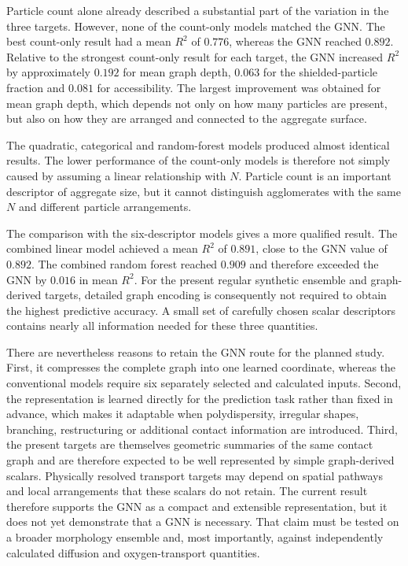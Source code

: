 \documentclass[12pt,a4paper]{article}
\begin{document}
Particle count alone already described a substantial part of the variation in
the three targets. However, none of the count-only models matched the GNN. The
best count-only result had a mean $R^2$ of $0.776$, whereas the GNN reached
$0.892$. Relative to the strongest count-only result for each target, the GNN
increased $R^2$ by approximately $0.192$ for mean graph depth, $0.063$ for the
shielded-particle fraction and $0.081$ for accessibility. The largest
improvement was obtained for mean graph depth, which depends not only on how
many particles are present, but also on how they are arranged and connected to
the aggregate surface.

The quadratic, categorical and random-forest models produced almost identical
results. The lower performance of the count-only models is therefore not simply
caused by assuming a linear relationship with $N$. Particle count is an
important descriptor of aggregate size, but it cannot distinguish agglomerates
with the same $N$ and different particle arrangements.

The comparison with the six-descriptor models gives a more qualified result.
The combined linear model achieved a mean $R^2$ of $0.891$, close to the GNN
value of $0.892$. The combined random forest reached $0.909$ and therefore
exceeded the GNN by $0.016$ in mean $R^2$. For the present regular synthetic
ensemble and graph-derived targets, detailed graph encoding is consequently not
required to obtain the highest predictive accuracy. A small set of carefully
chosen scalar descriptors contains nearly all information needed for these
three quantities.

There are nevertheless reasons to retain the GNN route for the planned study.
First, it compresses the complete graph into one learned coordinate, whereas
the conventional models require six separately selected and calculated inputs.
Second, the representation is learned directly for the prediction task rather
than fixed in advance, which makes it adaptable when polydispersity, irregular
shapes, branching, restructuring or additional contact information are
introduced. Third, the present targets are themselves geometric summaries of
the same contact graph and are therefore expected to be well represented by
simple graph-derived scalars. Physically resolved transport targets may depend
on spatial pathways and local arrangements that these scalars do not retain.
The current result therefore supports the GNN as a compact and extensible
representation, but it does not yet demonstrate that a GNN is necessary. That
claim must be tested on a broader morphology ensemble and, most importantly,
against independently calculated diffusion and oxygen-transport quantities.
\end{document}
